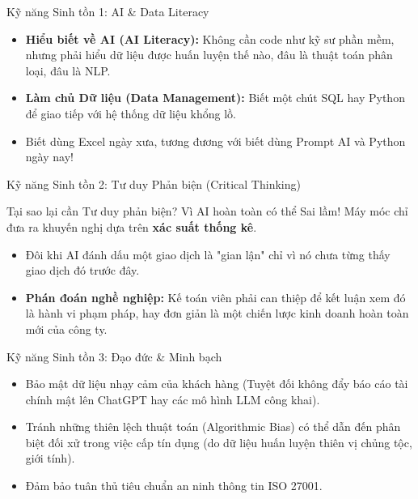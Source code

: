 \documentclass[aspectratio=169]{beamer}
\begin{document}
\begin{frame}{Kỹ năng Sinh tồn 1: AI \& Data Literacy}
    \begin{itemize}
        \item \textbf{Hiểu biết về AI (AI Literacy):} Không cần code như kỹ sư phần mềm, nhưng phải hiểu dữ liệu được huấn luyện thế nào, đâu là thuật toán phân loại, đâu là NLP.
        \item \textbf{Làm chủ Dữ liệu (Data Management):} Biết một chút SQL hay Python để giao tiếp với hệ thống dữ liệu khổng lồ.
        \item Biết dùng Excel ngày xưa, tương đương với biết dùng Prompt AI và Python ngày nay!
    \end{itemize}
\end{frame}
    
\begin{frame}{Kỹ năng Sinh tồn 2: Tư duy Phản biện (Critical Thinking)}
    \begin{alertblock}{Tại sao lại cần Tư duy phản biện?}
        Vì AI hoàn toàn có thể Sai lầm! Máy móc chỉ đưa ra khuyến nghị dựa trên \textbf{xác suất thống kê}.
    \end{alertblock}
    \begin{itemize}
        \item Đôi khi AI đánh dấu một giao dịch là "gian lận" chỉ vì nó chưa từng thấy giao dịch đó trước đây.
        \item \textbf{Phán đoán nghề nghiệp:} Kế toán viên phải can thiệp để kết luận xem đó là hành vi phạm pháp, hay đơn giản là một chiến lược kinh doanh hoàn toàn mới của công ty.
    \end{itemize}
\end{frame}

\begin{frame}{Kỹ năng Sinh tồn 3: Đạo đức \& Minh bạch}
    \begin{itemize}
        \item Bảo mật dữ liệu nhạy cảm của khách hàng (Tuyệt đối không đẩy báo cáo tài chính mật lên ChatGPT hay các mô hình LLM công khai).
        \item Tránh những thiên lệch thuật toán (Algorithmic Bias) có thể dẫn đến phân biệt đối xử trong việc cấp tín dụng (do dữ liệu huấn luyện thiên vị chủng tộc, giới tính).
        \item Đảm bảo tuân thủ tiêu chuẩn an ninh thông tin ISO 27001.
    \end{itemize}
\end{frame}
\end{document}
